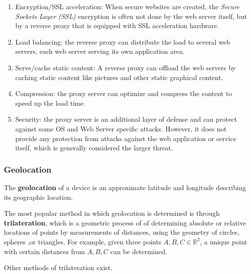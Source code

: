 \documentclass{article}
\begin{document}
\begin{definition}
\begin{enumerate}
      \begin{enumerate}
          \item Encryption/SSL acceleration: When secure websites are created, the \textit{Secure Sockets Layer (SSL)} encryption is often not done by the web server itself, but by a reverse proxy that is equipped with SSL acceleration hardware. 
          \item Load balancing: the reverse proxy can distribute the load to several web servers, each web server serving its own application area. 
          \item Serve/cache static content: A reverse proxy can offload the web servers by caching static content like pictures and other static graphical content.
          \item Compression: the proxy server can optimize and compress the content to speed up the load time.
          \item Security: the proxy server is an additional layer of defense and can protect against some OS and Web Server specific attacks. However, it does not provide any protection from attacks against the web application or service itself, which is generally considered the larger threat.
      \end{enumerate}
  \end{enumerate}
  \end{definition}

  \subsubsection{Geolocation}

  \begin{definition}
  The \textbf{geolocation} of a device is an approximate latitude and longitude describing its geographic location. 
  \end{definition}

  \begin{definition}
  The most popular method in which geolocation is determined is through \textbf{trilateration}, which is a geometric process of of determining absolute or relative locations of points by measurements of distances, using the geometry of circles, spheres ,or triangles. For example, given three points $A, B, C \in \mathbb{R}^2$, a unique point with certain distances from $A, B, C$ can be determined. 
  \begin{center}
  \end{center}
  Other methods of trilateration exist. 
  \end{definition}
\end{document}

